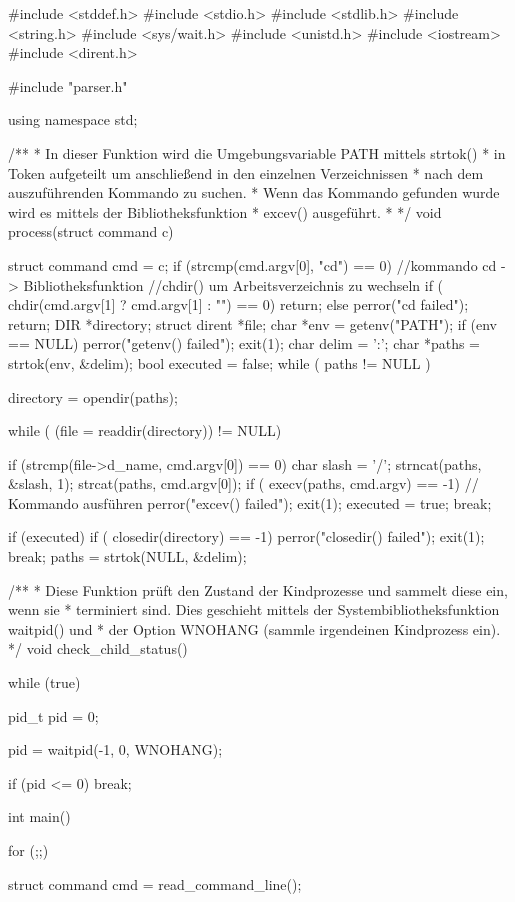 \documentclass{ti2}
\begin{document}
\begin{listing}{1}
#include <stddef.h>
#include <stdio.h>
#include <stdlib.h>
#include <string.h>
#include <sys/wait.h>
#include <unistd.h>
#include <iostream>
#include <dirent.h>

#include "parser.h"

using namespace std;

/**
 * In dieser Funktion wird die Umgebungsvariable PATH mittels strtok()
 * in Token aufgeteilt um anschließend in den einzelnen Verzeichnissen 
 * nach dem auszuführenden Kommando zu suchen.
 * Wenn das Kommando gefunden wurde wird es mittels der Bibliotheksfunktion 
 * excev() ausgeführt. 
 *
 */
void process(struct command c) {
          struct command cmd = c;
	  if (strcmp(cmd.argv[0], "cd") == 0) {//kommando cd -> Bibliotheksfunktion
	                                       //chdir() um Arbeitsverzeichnis zu wechseln 
	    if ( chdir(cmd.argv[1] ? cmd.argv[1] : "") == 0) {
	    return;
	  } else {
	    perror("cd failed");
	    return;
	  }
	}
          DIR *directory;
	  struct dirent *file;
	  char *env = getenv("PATH");
	  if (env == NULL) {
	    perror("getenv() failed");
	    exit(1);
	  }
	  char delim = ':';
	  char *paths = strtok(env, &delim);
	  bool executed = false;
	  while ( paths != NULL ) {
	    directory = opendir(paths);

	    while ( (file = readdir(directory)) != NULL) {
	      if (strcmp(file->d_name, cmd.argv[0]) == 0) {
		char slash = '/';
		strncat(paths, &slash, 1);
		strcat(paths, cmd.argv[0]);
		if ( execv(paths, cmd.argv) == -1) {// Kommando ausführen
		  perror("excev() failed");
		  exit(1);
		}
		executed = true;
		break;
	      }

	    }
	    if (executed) {
	      if ( closedir(directory) == -1) {
		perror("closedir() failed");
		exit(1);
	      }
	      break;
	    }
	    paths = strtok(NULL, &delim);
	  }
}

/**
 * Diese Funktion prüft den Zustand der Kindprozesse und sammelt diese ein, wenn sie
 * terminiert sind. Dies geschieht mittels der Systembibliotheksfunktion waitpid() und 
 * der Option WNOHANG (sammle irgendeinen Kindprozess ein).
 */
void check_child_status() {
  while (true) {
    pid_t pid = 0;

    pid = waitpid(-1, 0, WNOHANG);

    if (pid <= 0) {
      break;
    }
  }

}

int main(){
    for (;;){
	struct command cmd = read_command_line();

}}
\end{listing}
\end{document}
